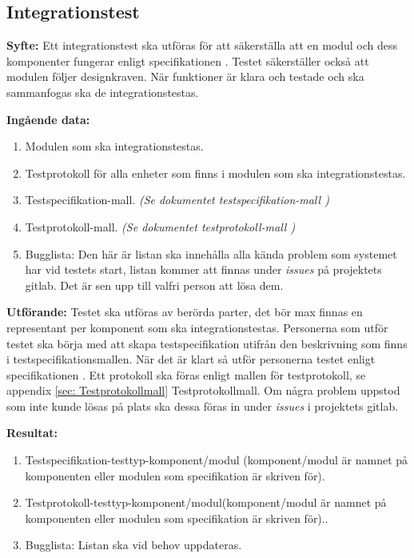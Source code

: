 \documentclass[a4paper,10pt, twoside]{article}
\begin{document}
\subsection{Integrationstest}
\label{sec:Integrationstest}
\textbf{Syfte:} Ett integrationstest ska utföras för att säkerställa att en modul och dess komponenter fungerar enligt specifikationen \cite{kravspec}. 	  Testet säkerställer också att modulen följer designkraven. När funktioner är klara och testade och ska sammanfogas ska de integrationstestas.

\textbf{Ingående data:}
\begin{enumerate}
	\item Modulen som ska integrationstestas.
    \item Testprotokoll för alla enheter som finns i modulen som ska integrationstestas.
    \item Testspecifikation-mall. \emph{(Se dokumentet testspecifikation-mall \cite{testspec-mall})}
    \item Testprotokoll-mall. \emph{(Se dokumentet testprotokoll-mall \cite{testprot-mall})}
    \item Bugglista: Den här är listan ska innehålla alla kända problem som systemet har vid testets start, listan kommer att finnas under \emph{issues}
     på projektets gitlab. Det är sen upp till valfri person att lösa dem.
\end{enumerate}

\textbf{Utförande:}
Testet ska utföras av berörda parter, det bör max finnas en representant per komponent som ska integrationstestas. Personerna som utför testet ska börja med att skapa testspecifikation utifrån den beskrivning som finns i testspecifikationsmallen. När det är klart så utför personerna testet enligt specifikationen \cite{kravspec}. Ett protokoll ska föras enligt mallen för testprotokoll, se appendix \ref{sec: Testprotokollmall} Testprotokollmall. Om några problem uppstod som inte kunde lösas på plats ska dessa föras in under \emph{issues} i projektets gitlab.

\textbf{Resultat:}
\begin{enumerate}
	\item \label{itm:Testspecifikation-i} Testspecifikation-testtyp-komponent/modul (komponent/modul är namnet på komponenten eller modulen som 													  specifikation är skriven för).
    \item \label{itm:Testprotokoll-i} Testprotokoll-testtyp-komponent/modul(komponent/modul är namnet på komponenten eller modulen som specifikation är 										  skriven för)..
    \item Bugglista: Listan ska vid behov uppdateras.
\end{enumerate}
\end{document}
